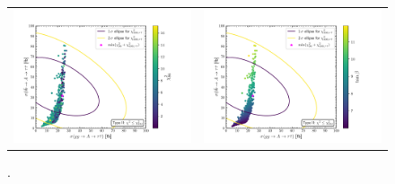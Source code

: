 \documentclass[12pt]{article}
\begin{document}
\begin{figure}[ht!]
	\begin{center}
		\begin{tabular}{cc}
			\centering
			\hspace*{-3mm}
			\includegraphics[scale=0.40]{figs/2_LLxs96.pdf} &
			\includegraphics[scale=0.40]{figs/2_LLxstb.pdf}
		\end{tabular}
		\caption{.}
		\label{fig:typeiisigma}
	\end{center}
\end{figure}
\end{document}
